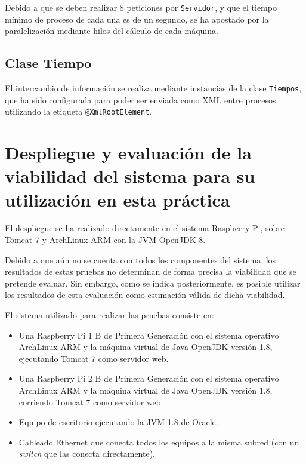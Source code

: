 \documentclass{article}
\newcommand{\javacode}[4]{
	
}
\begin{document}
Debido a que se deben realizar 8 peticiones por \verb+Servidor+, y que el tiempo mínimo de proceso de cada una es de un segundo, se ha apostado por la paralelización mediante hilos del cálculo de cada máquina.


\javacode{net/martinarroyo/ntp/Ntp}{Método main de la clase, encargado de leer de un fichero las direcciones a las que conectarse y realizando la invocación de los hilos}{35}{62}

\javacode{net/martinarroyo/ntp/Ntp}{Ejecución de cada hilo en el método run}{78}{103}

\subsection{Clase Tiempo}

El intercambio de información se realiza mediante instancias de la clase \verb+Tiempos+, que ha sido configurada para poder ser enviada como XML entre procesos utilizando la etiqueta \verb+@XmlRootElement+.

\javacode{net/martinarroyo/ntp/Tiempos}{Vista de los campos de información de la clase Tiempos}{5}{10}

\section{Despliegue y evaluación de la viabilidad del sistema para su utilización en esta práctica}

El despliegue se ha realizado directamente en el sistema Raspberry Pi, sobre Tomcat 7 y ArchLinux ARM con la JVM OpenJDK 8.

Debido a que aún no se cuenta con todos los componentes del sistema, los resultados de estas pruebas no determinan de forma precisa la viabilidad que se pretende evaluar. Sin embargo, como se indica posteriormente, es posible utilizar los resultados de esta evaluación como estimación válida de dicha viabilidad.

El sistema utilizado para realizar las pruebas consiste en:

\begin{itemize}
   \item Una Raspberry Pi 1 B de Primera Generación con el sistema operativo ArchLinux ARM y la máquina virtual de Java OpenJDK versión 1.8, ejecutando Tomcat 7 como servidor web. 
   \item Una Raspberry Pi 2 B de Primera Generación con el sistema operativo ArchLinux ARM y la máquina virtual de Java OpenJDK versión 1.8, corriendo Tomcat 7 como servidor web.
   \item Equipo de escritorio ejecutando la JVM 1.8 de Oracle.
   \item Cableado Ethernet que conecta todos los equipos a la misma subred (con un \textit{switch} que las conecta directamente).
\end{itemize}
\end{document}
